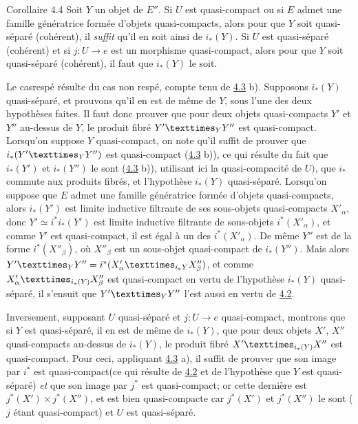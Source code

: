 \documentclass[10pt]{../fichiers-configuration-latex/smfart}
\begin{document}
\begin{enonce*}{Corollaire 4.4}
Soit $Y$ un objet de $E''$. Si $U$ est quasi-compact ou si $E$ admet
une famille génératrice formée d'objets quasi-compacts, alors pour que
$Y$ soit quasi-séparé (\resp cohérent), il \emph{suffit} qu'il en soit ainsi
de $i_{\ast} (Y)$. Si $U$ est quasi-séparé (\resp cohérent) et si $j :
U \to e$  est un morphisme quasi-compact, alors pour que $Y$ soit
quasi-séparé (\resp cohérent), il faut que $i_{\ast}(Y)$ le soit.
\end{enonce*}

Le cas\pageoriginale respé résulte du cas non respé, compte tenu de
\hyperref[VI.cor4.3]{4.3} b). Supposons $i_{\ast}(Y)$ quasi-séparé, et
prouvons qu'il en est de même de $Y$, sous l'une des deux hypothèses
faites. Il faut donc prouver que pour deux objets quasi-compacts
$Y'$  et $Y''$ au-dessus de $Y$, le produit fibré
$\fprod{Y'}{Y''}{Y}$ est quasi-compact. Lorsqu'on suppose $Y$
quasi-compact, on note qu'il suffit de prouver que
$i_{\ast}(\fprod{Y'}{Y''}{Y})$ est quasi-compact (\hyperref[VI.cor4.3]{4.3}
b)), ce qui résulte du fait que $i_{\ast}(Y')$ et $i_{\ast}(Y'')$ le
sont  (\hyperref[VI.cor4.3]{4.3} b)), utilisant ici la quasi-compacité de
$U)$, que $i_{\ast}$ commute aux produits fibrés, et l'hypothèse
$i_{\ast}(Y)$ quasi-séparé. Lorsqu'on suppose que $E$ admet une
famille génératrice formée d'objets quasi-compacts, alors
$i_{\ast}(Y')$ est limite inductive filtrante de ses sous-objets
quasi-compacts ${X'}_{\alpha}$, donc $Y' \simeq i^{\ast}
i_{\ast}(Y')$ est limite inductive filtrante de sous-objets
$i^{\ast}({X'}_{\alpha})$, et comme $Y'$ est quasi-compact, il est
égal à un des $i^{\ast}({X'}_{\alpha})$. De même $Y''$ est de la
forme $i^{\ast}({X''}_{\beta})$, où ${X''}_{\beta}$ est un
sous-objet quasi-compact de $i_{\ast}(Y'')$. Mais alors
$\fprod{Y'}{Y''}{Y} =
i^{\ast}(\fprod{X'_{\alpha}}{X''_{\beta}}{i_{\ast}Y})$, et comme
$\fprod{X'_{\alpha}}{X''_{\beta}}{i_{\ast}(Y)}$ est quasi-compact en
vertu de l'hypothèse $i_{\ast}(Y)$ quasi-séparé, il s'ensuit que
$\fprod{Y'}{Y''}{Y}$ l'est aussi en vertu de \hyperref[VI.prop4.2]{4.2}.

Inversement, supposant $U$ quasi-séparé et $j : U \to e$
quasi-compact, montrons que si $Y$ est quasi-séparé, il en est de
même de $i_{\ast}(Y)$, \ie que pour deux objets $X'$, $X''$
quasi-compacts au-dessus de $i_{\ast}(Y)$, le produit fibré
$\fprod{X'}{X''}{i_{\ast}(Y)}$ est quasi-compact. Pour ceci,
appliquant \hyperref[VI.cor4.3]{4.3} a), il suffit de prouver que son image
par $i^{\ast}$ est quasi-compact\pageoriginale (ce qui résulte de
\hyperref[VI.prop4.2]{4.2} et de l'hypothèse que $Y$ est quasi-séparé)
\emph{et} que son image par $j^{\ast}$ est quasi-compact; or cette
dernière est $j^{\ast}(X')\times j^{\ast}(X'')$, et est bien
quasi-compacte car $j^{\ast}(X')$ et $j^{\ast}(X'')$ le sont ($j$
étant quasi-compact) et $U$ est quasi-séparé.
\end{document}
